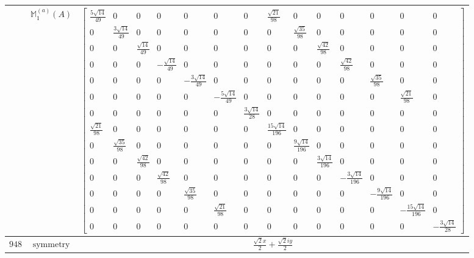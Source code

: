 \documentclass[fleqn,8pt,landscape]{jsarticle}
\begin{document}
\begin{longtable}{ccc}
$  $ & $ \mathbb{M}_{1}^{(a)}(A) $ & $ \begin{bmatrix} \frac{5 \sqrt{14}}{49} & 0 & 0 & 0 & 0 & 0 & 0 & \frac{\sqrt{21}}{98} & 0 & 0 & 0 & 0 & 0 & 0 \\ 0 & \frac{3 \sqrt{14}}{49} & 0 & 0 & 0 & 0 & 0 & 0 & \frac{\sqrt{35}}{98} & 0 & 0 & 0 & 0 & 0 \\ 0 & 0 & \frac{\sqrt{14}}{49} & 0 & 0 & 0 & 0 & 0 & 0 & \frac{\sqrt{42}}{98} & 0 & 0 & 0 & 0 \\ 0 & 0 & 0 & - \frac{\sqrt{14}}{49} & 0 & 0 & 0 & 0 & 0 & 0 & \frac{\sqrt{42}}{98} & 0 & 0 & 0 \\ 0 & 0 & 0 & 0 & - \frac{3 \sqrt{14}}{49} & 0 & 0 & 0 & 0 & 0 & 0 & \frac{\sqrt{35}}{98} & 0 & 0 \\ 0 & 0 & 0 & 0 & 0 & - \frac{5 \sqrt{14}}{49} & 0 & 0 & 0 & 0 & 0 & 0 & \frac{\sqrt{21}}{98} & 0 \\ 0 & 0 & 0 & 0 & 0 & 0 & \frac{3 \sqrt{14}}{28} & 0 & 0 & 0 & 0 & 0 & 0 & 0 \\ \frac{\sqrt{21}}{98} & 0 & 0 & 0 & 0 & 0 & 0 & \frac{15 \sqrt{14}}{196} & 0 & 0 & 0 & 0 & 0 & 0 \\ 0 & \frac{\sqrt{35}}{98} & 0 & 0 & 0 & 0 & 0 & 0 & \frac{9 \sqrt{14}}{196} & 0 & 0 & 0 & 0 & 0 \\ 0 & 0 & \frac{\sqrt{42}}{98} & 0 & 0 & 0 & 0 & 0 & 0 & \frac{3 \sqrt{14}}{196} & 0 & 0 & 0 & 0 \\ 0 & 0 & 0 & \frac{\sqrt{42}}{98} & 0 & 0 & 0 & 0 & 0 & 0 & - \frac{3 \sqrt{14}}{196} & 0 & 0 & 0 \\ 0 & 0 & 0 & 0 & \frac{\sqrt{35}}{98} & 0 & 0 & 0 & 0 & 0 & 0 & - \frac{9 \sqrt{14}}{196} & 0 & 0 \\ 0 & 0 & 0 & 0 & 0 & \frac{\sqrt{21}}{98} & 0 & 0 & 0 & 0 & 0 & 0 & - \frac{15 \sqrt{14}}{196} & 0 \\ 0 & 0 & 0 & 0 & 0 & 0 & 0 & 0 & 0 & 0 & 0 & 0 & 0 & - \frac{3 \sqrt{14}}{28} \end{bmatrix} $ \\ \hline
$ 948 $ & $ \text{symmetry} $ & $ \frac{\sqrt{2} x}{2} + \frac{\sqrt{2} i y}{2} $ \\

\end{longtable}
\end{document}
